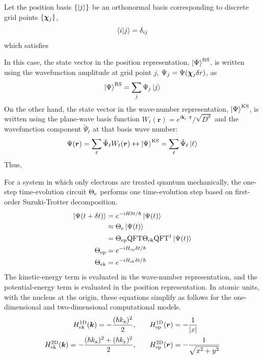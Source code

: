 \documentclass[a4paper,11pt]{article}
\begin{document}
Let the position basis $\{\ket{j}\}$ be an orthonormal basis corresponding to
discrete grid points $\{\bm{\chi}_{j}\}$,
\begin{equation}
\braket{i|j}=\delta_{ij}
\end{equation}
which satisfies

In this case, the state vector in the position representation, $\ket{\Psi}^{\mathrm{RS}}$, is
written using the wavefunction amplitude at grid point $j$,
$\Psi_j=\Psi(\bm{\chi}_{j}\delta r)$, as
\begin{equation}
\ket{\Psi}^{\mathrm{RS}} = \sum_{j}\Psi_j\ket{j}
\end{equation}
On the other hand, the state vector in the wave-number representation,
$\ket{\Psi}^{\mathrm{KS}}$, is written using the plane-wave basis function
$W_{\ell}(\bm{r})=e^{i\bm{k}_{\ell}\cdot\bm{r}}/\sqrt{D^d}$ and the wavefunction
component $\tilde{\Psi}_{\ell}$ at that basis wave number:
\begin{equation}
\Psi(\bm{r})=\sum_{\ell} \tilde{\Psi}_{\ell}W_{\ell}(\bm{r})\leftrightarrow
\ket{\Psi}^{\mathrm{KS}} = \sum_{\ell}\tilde{\Psi}_{\ell}\ket{\ell}
\end{equation}
Thus,

For a system in which only electrons are treated quantum mechanically, the
one-step time-evolution circuit $\Theta_{\mathrm{e}}$ performs one time-evolution step based
on first-order Suzuki-Trotter decomposition.
\begin{align}
\ket{\Psi(t+\delta t)}
 &= e^{-iH\delta t/\hbar}\ket{\Psi(t)} \notag \\
 &\approx \Theta_{\mathrm{e}} \ket{\Psi(t)} \label{eq:circuit-eval-theta-e}\\
 &= \Theta_{\mathrm{ep}}\mathrm{QFT}\Theta_{\mathrm{ek}}\mathrm{QFT}^\dagger\ket{\Psi(t)}\\
    \Theta_{\mathrm{ep}}&=e^{-iH_{\mathrm{ep}}\delta t/\hbar}\\
    \Theta_{\mathrm{ek}}&=e^{-iH_{\mathrm{ek}}\delta t/\hbar}
\end{align}
The kinetic-energy term is evaluated in the wave-number representation, and the
potential-energy term is evaluated in the position representation. In atomic
units, with the nucleus at the origin, these equations simplify as follows for
the one-dimensional and two-dimensional computational models.
\begin{align}
   H_{\mathrm{ek}}^{\mathrm{1D}}(\bm{k}) = -\frac{(\hbar k_{\mathrm{x}})^2}{2}, \qquad &
   H_{\mathrm{ep}}^{\mathrm{1D}}(\bm{r}) = -\frac{1}{{\left| x \right|}} \label{eq:HkHp1D}\\
   H_{\mathrm{ek}}^{\mathrm{2D}}(\bm{k}) = -\frac{(\hbar k_{\mathrm{x}})^2 + (\hbar k_{\mathrm{y}})^2}{2}, \qquad &
   H_{\mathrm{ep}}^{\mathrm{2D}}(\bm{r}) = -\frac{1}{\sqrt{x^2+y^2}} \label{eq:HkHp2D}
\end{align}
\end{document}

